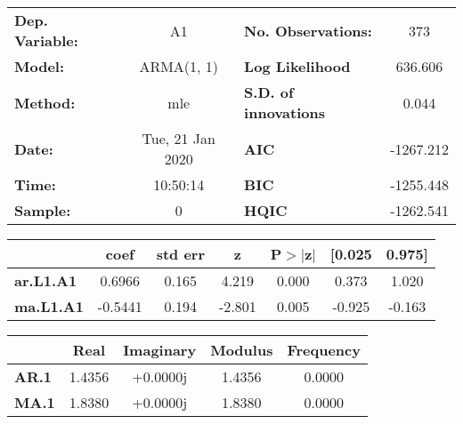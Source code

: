 \begin{center}
\begin{tabular}{lclc}
\toprule
\textbf{Dep. Variable:} &             A1            & \textbf{  No. Observations:  } &            373             \\
\textbf{Model:}         &         ARMA(1, 1)        & \textbf{  Log Likelihood     } &          636.606           \\
\textbf{Method:}        &            mle            & \textbf{  S.D. of innovations} &           0.044            \\
\textbf{Date:}          &      Tue, 21 Jan 2020     & \textbf{  AIC                } &         -1267.212          \\
\textbf{Time:}          &          10:50:14         & \textbf{  BIC                } &         -1255.448          \\
\textbf{Sample:}        &             0             & \textbf{  HQIC               } &         -1262.541          \\
\bottomrule
\end{tabular}
\begin{tabular}{lcccccc}
                  & \textbf{coef} & \textbf{std err} & \textbf{z} & \textbf{P$>$$|$z$|$} & \textbf{[0.025} & \textbf{0.975]}  \\
\midrule
\textbf{ar.L1.A1} &       0.6966  &        0.165     &     4.219  &         0.000        &        0.373    &        1.020     \\
\textbf{ma.L1.A1} &      -0.5441  &        0.194     &    -2.801  &         0.005        &       -0.925    &       -0.163     \\
\bottomrule
\end{tabular}
\begin{tabular}{lcccc}
              & \textbf{            Real} & \textbf{         Imaginary} & \textbf{         Modulus} & \textbf{        Frequency}  \\
\midrule
\textbf{AR.1} &                1.4356     &                +0.0000j     &                1.4356     &                0.0000       \\
\textbf{MA.1} &                1.8380     &                +0.0000j     &                1.8380     &                0.0000       \\
\bottomrule
\end{tabular}
\end{center}